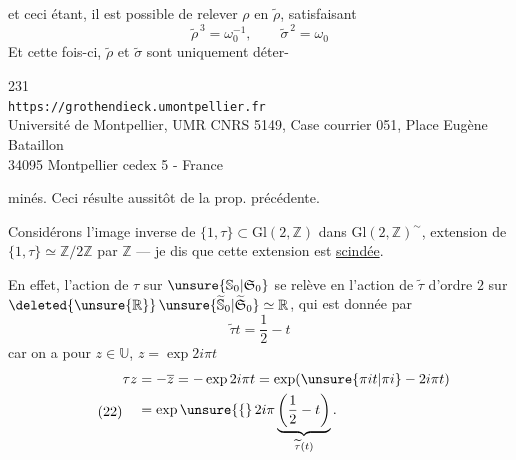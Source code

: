 
et ceci étant, il est possible de relever $\rho$ en $\widetilde\rho$,
 satisfaisant
\[
\tag{20}
\widetilde\rho^{\,3}=\omega_0^{-1},\qquad
\widetilde\sigma^{\,2}=\omega_0
\]
Et cette fois-ci, $\widetilde\rho$ et $\widetilde\sigma$
sont uniquement déter-


\begin{center}
231\\
\texttt{https://grothendieck.umontpellier.fr}\\
Université de Montpellier, UMR CNRS 5149, Case courrier 051, Place Eugène Bataillon\\
34095 Montpellier cedex 5 - France
\end{center}

minés. Ceci résulte 
aussitôt de la prop. précédente.

Considérons l'image inverse de $\{1,\tau\}\subset\mathrm{Gl}(2,\mathbb Z)$
dans $\mathrm{Gl}(2,\mathbb Z)^{\sim}$,
 extension de
$\{1,\tau\}\simeq\mathbb Z/2\mathbb Z$ par $\mathbb Z$
--- je dis que cette extension est \uline{scindée}.


En effet, l'action de $\tau$ sur $\unsure{\mathbb S_0|\mathfrak S_0}$
se relève en l'action de $\widetilde\tau$ 
d'ordre $2$ sur
$\deleted{\unsure{\mathbb R}}\,
\unsure{\widetilde{\mathbb S}_0|\widetilde{\mathfrak S}_0}\simeq\mathbb R$,
qui est donnée par
\[
\tag{21}
\widetilde\tau t=\frac12-t
\]
car on a pour $z\in\mathbb U$, $z=\exp 2i\pi t$
\[
\tag{22}
\begin{aligned}
\tau z&=-\overline z=-\exp 2i\pi t
=\exp(\unsure{\pi it|\pi i}-2i\pi t)\\
&=\exp\unsure{\{}\,2i\pi
\underbrace{\left(\frac12-t\right)}_{\widetilde\tau(t)}.
\end{aligned}
\]

